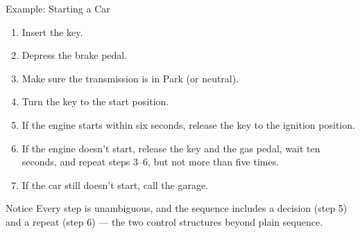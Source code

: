 \documentclass[9pt,aspectratio=169,xcolor=table]{beamer}
\begin{document}
\begin{frame}{Example: Starting a Car}
    \leavevmode
    \small
    \begin{enumerate}\itemsep2pt
        \item Insert the key.
        \item Depress the brake pedal.
        \item Make sure the transmission is in Park (or neutral).
        \item Turn the key to the start position.
        \item If the engine starts within six seconds, release the key to
              the ignition position.
        \item If the engine doesn't start, release the key and the gas
              pedal, wait ten seconds, and repeat steps 3--6, but not
              more than five times.
        \item If the car still doesn't start, call the garage.
    \end{enumerate}

    \vspace{2mm}
    \begin{block}{Notice}
        Every step is unambiguous, and the sequence includes a
        \alert{decision} (step 5) and a \alert{repeat} (step 6) --- the
        two control structures beyond plain sequence.
    \end{block}
\end{frame}
\end{document}
